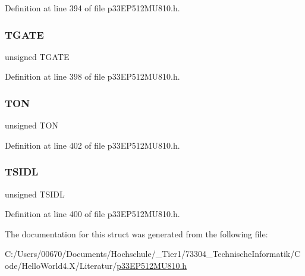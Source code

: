 Definition at line 394 of file p33\+E\+P512\+M\+U810.\+h.

\mbox{\label{structtag_t6_c_o_n_b_i_t_s_a35b6e4b591a8bd20e026168399eb0e6a}} 
\subsubsection{\texorpdfstring{T\+G\+A\+TE}{TGATE}}
{\footnotesize\ttfamily unsigned T\+G\+A\+TE}



Definition at line 398 of file p33\+E\+P512\+M\+U810.\+h.

\mbox{\label{structtag_t6_c_o_n_b_i_t_s_a8c2a094047d1019ce1c5b25ea8cff9b3}} 
\subsubsection{\texorpdfstring{T\+ON}{TON}}
{\footnotesize\ttfamily unsigned T\+ON}



Definition at line 402 of file p33\+E\+P512\+M\+U810.\+h.

\mbox{\label{structtag_t6_c_o_n_b_i_t_s_a4971b881615ef42703b5b78179fcda3d}} 
\subsubsection{\texorpdfstring{T\+S\+I\+DL}{TSIDL}}
{\footnotesize\ttfamily unsigned T\+S\+I\+DL}



Definition at line 400 of file p33\+E\+P512\+M\+U810.\+h.



The documentation for this struct was generated from the following file\+:\begin{DoxyCompactItemize}
\item 
C\+:/\+Users/00670/\+Documents/\+Hochschule/\+\_\+\+Tier1/73304\+\_\+\+Technische\+Informatik/\+Code/\+Hello\+World4.\+X/\+Literatur/\hyperlink{p33_e_p512_m_u810_8h}{p33\+E\+P512\+M\+U810.\+h}\end{DoxyCompactItemize}
